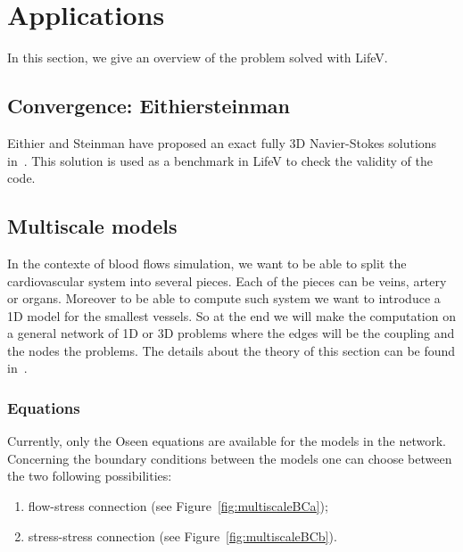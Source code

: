 \documentclass[11pt]{article}
\begin{document}
\section{Applications}
\label{sec:applications}
In this section, we give an overview of the problem solved with LifeV.

\subsection{Convergence: Eithiersteinman}
Eithier and Steinman have proposed an exact fully 3D Navier-Stokes solutions in~\cite{ethiersteinman}. This solution is used as a benchmark in LifeV to check the validity of the code.

\subsection{Multiscale models}
In the contexte of blood flows simulation, we want to be able to split the cardiovascular system into several pieces. Each of the pieces can be veins, artery or organs. Moreover to be able to compute such system we want to introduce a 1D model for the smallest vessels. So at the end we will make the computation on a general network of 1D or 3D problems where the edges will be the coupling and the nodes the problems. The details about the theory of this section can be found in~\cite{malossi}.

\subsubsection{Equations}
Currently, only the Oseen equations are available for the models in the network. Concerning the boundary conditions between the models one can choose between the two following possibilities:
\begin{enumerate}
\item flow-stress connection (see Figure~\ref{fig:multiscaleBCa});
\item stress-stress connection (see Figure~\ref{fig:multiscaleBCb}).
\end{enumerate}
\end{document}
